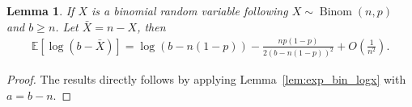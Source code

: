 \documentclass[onecolumn,romanappendices,10pt]{IEEEtran}
\newtheorem{lemma}{Lemma}
\newcommand{\EE}{{\mathbb{E}}}
\DeclareMathOperator{\Bernoulli}{Bern}
\DeclareMathOperator{\Binomial}{Binom}
\begin{document}
	
	\begin{lemma} \label{lem:exp_bin_log-x}
		If $X$ is a binomial random variable following $X \sim \Binomial(n, p)$ and $b \geq n$. Let $\bar{X} = n - X$, then
		\begin{equation}
			\begin{aligned}
				\EE \left[ \log (b - \bar{X}) \right] = \log (b - n(1-p)) - \frac{np (1 - p)}{2 (b - n(1-p))^2} + O\left( \frac{1}{n^2} \right).
			\end{aligned}
		\end{equation}
	\end{lemma}
	
	\begin{proof}
		The results directly follows by applying Lemma~\ref{lem:exp_bin_logx} with $a = b-n$.
	\end{proof}
	
\end{document}
